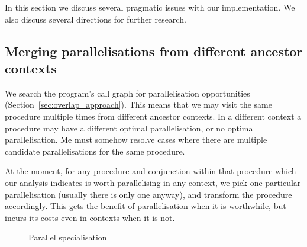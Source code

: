 
In this section we discuss several pragmatic issues with our implementation.
We also discuss several directions for further research.



\subsection{Merging parallelisations from different ancestor contexts}
\label{sec:overlap_pragma_merge}

We search the program's
call graph for parallelisation opportunities
(Section~\ref{sec:overlap_approach}).
This means that we may visit the same procedure multiple times from
different ancestor contexts.
In a different context a procedure may have a different optimal
parallelisation,
or no optimal parallelisation.
Me must somehow resolve cases where there are multiple candidate
parallelisations for the same procedure.

At the moment, for any procedure and conjunction within that procedure
which our analysis indicates is worth parallelising in any context,
we pick one particular parallelisation (usually there is only one anyway),
and transform the procedure accordingly.
This gets the benefit of parallelisation when it is worthwhile,
but incurs its costs even in contexts when it is not.

\begin{figure}
\begin{center}
\end{center}
\caption{Parallel specialisation}
\label{fig:par_specialisation}
\end{figure}

